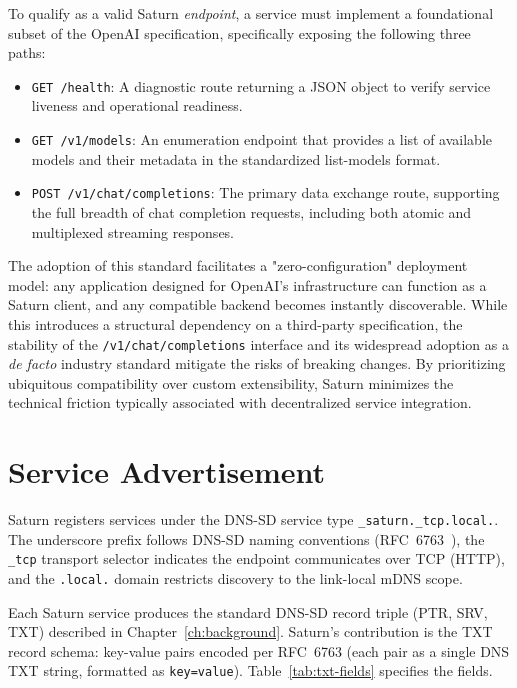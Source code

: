 To qualify as a valid Saturn \emph{endpoint}, a service must implement a foundational subset of the OpenAI specification, specifically exposing the following three paths:
\begin{itemize}
    \item \texttt{GET /health}: A diagnostic route returning a JSON object to verify service liveness and operational readiness.
    \item \texttt{GET /v1/models}: An enumeration endpoint that provides a list of available models and their metadata in the standardized list-models format.
    \item \texttt{POST /v1/chat/completions}: The primary data exchange route, supporting the full breadth of chat completion requests, including both atomic and multiplexed streaming responses.
\end{itemize}

The adoption of this standard facilitates a "zero-configuration" deployment model: any application designed for OpenAI’s infrastructure can function as a Saturn client, and any compatible backend becomes instantly discoverable. While this introduces a structural dependency on a third-party specification, the stability of the \texttt{/v1/chat/\allowbreak{}completions} interface and its widespread adoption as a \textit{de facto} industry standard mitigate the risks of breaking changes. By prioritizing ubiquitous compatibility over custom extensibility, Saturn minimizes the technical friction typically associated with decentralized service integration.

\section{Service Advertisement}
\label{sec:service-advertisement}
\label{sec:service-type}
\label{sec:txt-schema}

Saturn registers services under the DNS-SD service type \texttt{\_saturn.\_tcp.local.}. The underscore prefix follows DNS-SD naming conventions (RFC~6763~\cite{rfc6763}), the \texttt{\_tcp} transport selector indicates the endpoint communicates over TCP (HTTP), and the \texttt{.local.} domain restricts discovery to the link-local mDNS scope.

Each Saturn service produces the standard DNS-SD record triple (PTR, SRV, TXT) described in Chapter~\ref{ch:background}. Saturn's contribution is the TXT record schema: key-value pairs encoded per RFC~6763 (each pair as a single DNS TXT string, formatted as \texttt{key=value}). Table~\ref{tab:txt-fields} specifies the fields.

